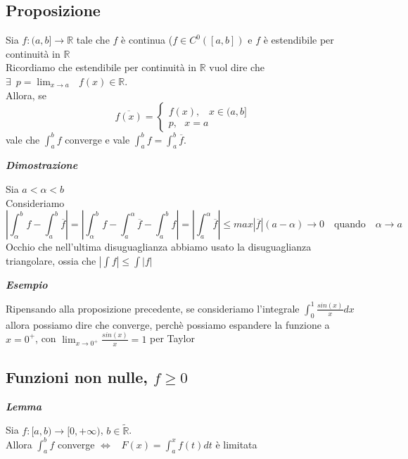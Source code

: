 \documentclass{article}
\theoremstyle{definition}
\newcommand{\R}{\mathbb{R}}
\begin{document}
\subsection{Proposizione}
Sia $f:(a,b] \to \R$ tale che $f$ è continua ($f \in C^0([a,b])$ e $f$ è estendibile per continuità in $\R$ 
\\
Ricordiamo che estendibile per continuità in $\R$ vuol dire che $\exists \,\,\, p =\lim_{x \to a} \,\,\,\, f(x) \in \R$.
\\
Allora, se 
\begin{equation*}
    \overline{f(x)}=\begin{cases}
        f(x) ,\,\,\,\,\, x \in (a,b] \\
        p , \,\,\,\, x=a
    \end{cases}
\end{equation*}
vale che $\int_a^b f$ converge e vale $\int_a^bf=\int_a^b \overline{f}$.

\begin{center}
    \textbf{\textit{Dimostrazione}}
\end{center}
Sia $a < \alpha < b$
\\
Consideriamo 
\begin{equation*}
    \left|\int_\alpha^b f- \int_a^b \overline{f}\right|=\left|\int_\alpha^b f - \int_a^\alpha \overline{f}-\int_a^b f\right|=\left|\int_a^\alpha \overline{f}\right| \leqslant max\left|\overline{f}\right|(a-\alpha) \to 0 \,\,\,\,\,\, \mbox{quando} \,\,\,\,\,\, \alpha \to a
\end{equation*}
Occhio che nell'ultima disuguaglianza abbiamo usato la disuguaglianza triangolare, ossia che $|\int f| \leqslant \int |f|$

\begin{center}
    \textbf{\textit{Esempio}}
\end{center}
Ripensando alla proposizione precedente, se consideriamo l'integrale $\int_0^1 \frac{sin(x)}{x}dx$ allora possiamo dire che converge, perchè possiamo espandere la funzione a $x=0^+$, con $\lim_{x \to 0^+}\frac{sin(x)}{x}=1$ per Taylor


\subsection{Funzioni non nulle, $f \geqslant 0$}
\begin{center}
    \textbf{\textit{Lemma}}
\end{center}
Sia $f:[a,b) \to [0,+\infty)$, $b \in \tilde{\R}$.
\\
Allora $\int_a^b f$ converge $\Longleftrightarrow \,\,\,\,\, F(x) = \int_a^x f(t)dt$ è limitata
\end{document}
